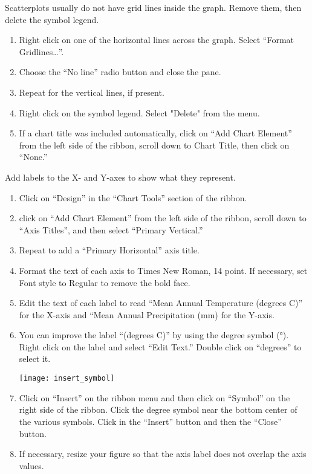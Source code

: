\documentclass[12pt, hidelinks]{exam}
\begin{document}
Scatterplots usually do not have grid lines inside the graph. Remove them, then delete the symbol legend.

\begin{enumerate}[resume]
	\item Right click on one of the horizontal lines across the graph. Select “Format Gridlines\dots”.

	\item Choose the “No line” radio button and close the pane. 

	\item Repeat for the vertical lines, if present.
	
	\item Right click on the symbol legend. Select "Delete" from the menu.
	
	\item If a chart title was included automatically, click on “Add Chart Element” from the left side of the ribbon, scroll down to Chart Title, then click on “None.” 
\end{enumerate}

Add labels to the X- and Y-axes to show what they represent.

\begin{enumerate}[resume]
	\item Click on “Design” in the “Chart Tools” section of the ribbon.

	\item click on “Add Chart Element” from the left side of the ribbon, scroll down to “Axis Titles”, and then select “Primary Vertical.”

	\item Repeat to add a “Primary Horizontal” axis title.

	\item Format the text of each axis to Times New Roman, 14 point. If necessary, set Font style to Regular to remove the bold face.

	\item Edit the text of each label to read “Mean Annual Temperature (degrees C)” for the X-axis and “Mean Annual Precipitation (mm) for the Y-axis.

	\item You can improve the label “(degrees C)” by using the degree symbol (°). Right click on the label and select “Edit Text.” Double click on “degrees” to select it.

\begin{center}
	\texttt{[image: insert\_symbol]}
\end{center}

	\item Click on “Insert” on the ribbon menu and then click on “Symbol” on the right side of the ribbon. Click the degree symbol near the bottom center of the various symbols. Click in the “Insert” button and then the “Close” button. 
	
	\item If necessary, resize your figure so that the axis label does not overlap the axis values.
\end{enumerate}
 
\end{document}
